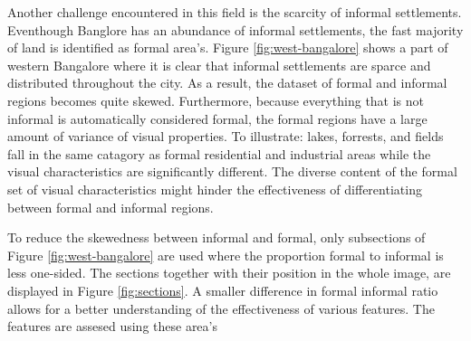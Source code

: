 Another challenge encountered in this field is the scarcity of informal
settlements.  Eventhough Banglore  has an abundance of informal settlements,
the fast majority of land is identified as formal area's. Figure
\ref{fig:west-bangalore} shows a part of western Bangalore where it is clear
that informal settlements are sparce and distributed throughout the city. As
a result, the dataset of formal and informal regions becomes quite skewed.
Furthermore, because everything that is not informal is automatically
considered formal, the formal regions have a large amount of variance of visual
properties.  To illustrate: lakes, forrests, and fields fall in the same
catagory as formal residential and industrial areas while the visual
characteristics are significantly different. The diverse content of the formal
set of visual characteristics might hinder the effectiveness of differentiating
between formal and informal regions. 

To reduce the skewedness between informal and formal, only subsections of
Figure \ref{fig:west-bangalore} are used where the proportion formal to
informal is less one-sided. The sections together with their position in the whole image, are displayed in Figure \ref{fig:sections}. A smaller difference in formal informal ratio allows for
a better understanding of the effectiveness of various features. The features
are assesed using these area's 



